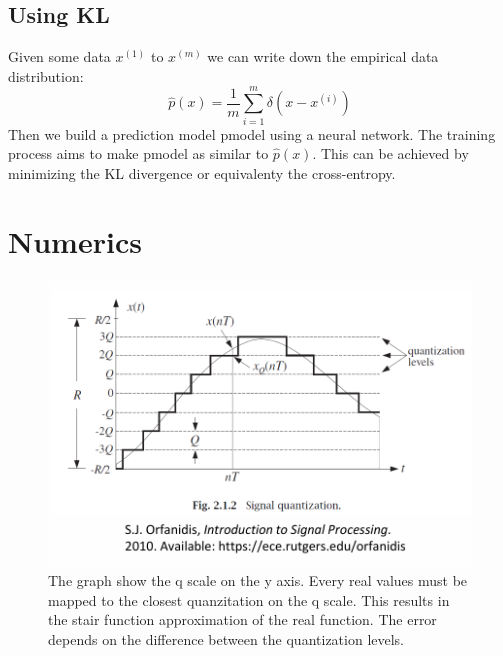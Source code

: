 \documentclass[../Main.tex]{subfiles}
\begin{document}
\subsection{Using KL}
Given some data \(x^{(1)}\) to \(x^{(m)}\) we can write down the empirical data distribution:
\begin{equation*}
    \hat{p}(x) = \frac{1}{m} \sum_{i=1}^{m} \delta (x -x^{(i)})
\end{equation*}
Then we build a prediction model pmodel using a neural network.
The training process aims to make pmodel as similar to \(\hat{p}(x)\).
This can be achieved by minimizing the KL divergence or equivalenty the cross-entropy.

\section{Numerics}


\begin{figure}[H]
    \centering
    \includegraphics[width=0.75\linewidth]{Images/quantization-error.png}
    \caption{The graph show the q scale on the y axis. Every real values must be mapped to the
    closest quanzitation on the q scale. This results in the stair function approximation of the real function.
    The error depends on the difference between the quantization levels.}
\end{figure}

\end{document}
